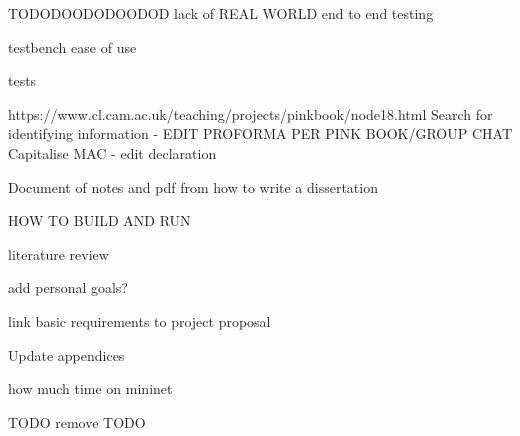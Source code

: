 \documentclass[12pt,a4paper,twoside,openright]{report}
\begin{document}
TODODOODODOODOD
lack of REAL WORLD end to end testing

testbench ease of use

tests

https://www.cl.cam.ac.uk/teaching/projects/pinkbook/node18.html
Search for identifying information - EDIT PROFORMA PER PINK BOOK/GROUP CHAT
Capitalise MAC - edit declaration

Document of notes and pdf from how to write a dissertation

HOW TO BUILD AND RUN

literature review

add personal goals?

link basic requirements to project proposal

Update appendices

how much time on mininet

TODO remove TODO
\end{document}
